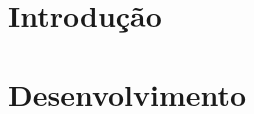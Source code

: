\documentclass[11pt,a4paper,titlepage,openright,oneside]{book}
\begin{document}




\sumario
\listadefiguras
\listadetabelas



\mainmatter
\setcounter{page}{1}  \pagestyle{plain}

\part{Introdução}




\part{Desenvolvimento}
 
\end{document}
